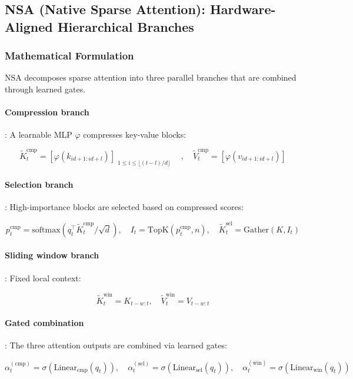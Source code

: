 \documentclass[11pt,a4paper]{article}
\begin{document}
\subsection{NSA (Native Sparse Attention): Hardware-Aligned Hierarchical Branches}

\subsubsection{Mathematical Formulation}

NSA \citep{yuan_nsa_2025} decomposes sparse attention into three parallel branches that are combined through learned gates.

\paragraph{Compression branch}: A learnable MLP $\varphi$ compresses key-value blocks:

\[
\tilde{K}_t^{\text{cmp}} = \left[\varphi(k_{id+1:id+l})\right]_{\substack{1 \leq i \leq \lfloor(t-l)/d\rfloor}} \quad, \quad \tilde{V}_t^{\text{cmp}} = \left[\varphi(v_{id+1:id+l})\right]
\]

\paragraph{Selection branch}: High-importance blocks are selected based on compressed scores:

\[
p_t^{\text{cmp}} = \text{softmax}(q_t^\top \tilde{K}_t^{\text{cmp}} / \sqrt{d}), \quad I_t = \mathrm{TopK}(p_t^{\text{cmp}}, n), \quad \tilde{K}_t^{\text{sel}} = \mathrm{Gather}(K, I_t)
\]

\paragraph{Sliding window branch}: Fixed local context:

\[
\tilde{K}_t^{\text{win}} = K_{t-w:t}, \quad \tilde{V}_t^{\text{win}} = V_{t-w:t}
\]

\paragraph{Gated combination}: The three attention outputs are combined via learned gates:

\[
\alpha_t^{(\text{cmp})} = \sigma(\text{Linear}_\text{cmp}(q_t)), \quad \alpha_t^{(\text{sel})} = \sigma(\text{Linear}_\text{sel}(q_t)), \quad \alpha_t^{(\text{win})} = \sigma(\text{Linear}_\text{win}(q_t))
\]
\end{document}
